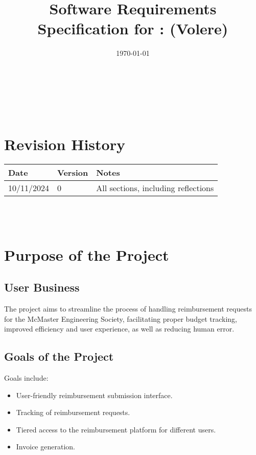 \documentclass[12pt]{article}
\begin{document}
\title{Software Requirements Specification for \progname: (Volere)} 
\author{\authname}
\date{\today}
	
\maketitle

~\newpage


\tableofcontents

~\newpage

\section*{Revision History}

\begin{tabularx}{\textwidth}{p{3cm}p{2cm}X}
\toprule {\textbf{Date}} & {\textbf{Version}} & {\textbf{Notes}}\\
\midrule
10/11/2024 & 0 & All sections, including reflections\\
\bottomrule
\end{tabularx}

~\\

~\newpage
\section{Purpose of the Project}
\subsection{User Business}
The project aims to streamline the process of handling reimbursement requests for the McMaster Engineering Society, facilitating proper budget tracking, improved efficiency and user experience, as well as reducing human error.

\subsection{Goals of the Project}
Goals include:
\begin{itemize}
    \item User-friendly reimbursement submission interface.
    \item Tracking of reimbursement requests.
    \item Tiered access to the reimbursement platform for different users.
    \item Invoice generation.
\end{itemize}
\end{document}
